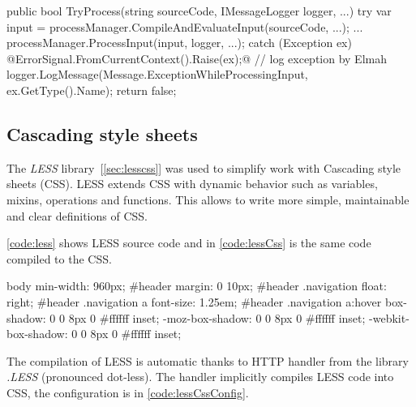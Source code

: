 \begin{Csharp}[label=code:elmahCode,caption={...}]
public bool TryProcess(string sourceCode, IMessageLogger logger, ...) {
	try {
		var input = processManager.CompileAndEvaluateInput(sourceCode, ...);
		...
		processManager.ProcessInput(input, logger, ...);
	}
	catch (Exception ex) {
		@ErrorSignal.FromCurrentContext().Raise(ex);@  // log exception by Elmah
		logger.LogMessage(Message.ExceptionWhileProcessingInput, ex.GetType().Name);
		return false;
	}
}
\end{Csharp}



\subsection{Cascading style sheets}

The \emph{LESS} library~[\ref{sec:lesscss}] was used to simplify work with Cascading style sheets (CSS).
LESS extends CSS with dynamic behavior such as variables, mixins, operations and functions.
This allows to write more simple, maintainable and clear definitions of CSS.

\autoref{code:less} shows LESS source code and in \autoref{code:lessCss} is the same code compiled to the CSS.


\begin{Css}[label=code:lessCss,caption={Compiled LESS code (\autoref{code:less}) to CSS}]
body { min-width: 960px; }
#header { margin: 0 10px; }
#header .navigation { float: right; }
#header .navigation a { font-size: 1.25em; }
#header .navigation a:hover {
	box-shadow: 0 0 8px 0 #ffffff inset;
	-moz-box-shadow: 0 0 8px 0 #ffffff inset;
	-webkit-box-shadow: 0 0 8px 0 #ffffff inset;
}
\end{Css}


The compilation of LESS is automatic thanks to HTTP handler from the library \emph{.LESS} (pronounced dot-less).
The handler implicitly compiles LESS code into CSS, the configuration is in \autoref{code:lessCssConfig}.


